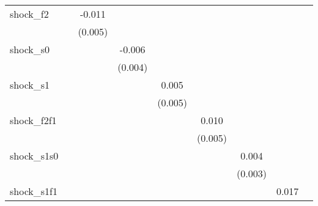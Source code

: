 {\begin{tabular}{l*{8}{c}}
\addlinespace
shock\_f2    &                     &      -0.011\sym{**} &                     &                     &                     &                     &                     &                     \\
            &                     &     (0.005)         &                     &                     &                     &                     &                     &                     \\
\addlinespace
shock\_s0    &                     &                     &      -0.006         &                     &                     &                     &                     &                     \\
            &                     &                     &     (0.004)         &                     &                     &                     &                     &                     \\
\addlinespace
shock\_s1    &                     &                     &                     &       0.005         &                     &                     &                     &                     \\
            &                     &                     &                     &     (0.005)         &                     &                     &                     &                     \\
\addlinespace
shock\_f2f1  &                     &                     &                     &                     &       0.010\sym{*}  &                     &                     &                     \\
            &                     &                     &                     &                     &     (0.005)         &                     &                     &                     \\
\addlinespace
shock\_s1s0  &                     &                     &                     &                     &                     &       0.004         &                     &                     \\
            &                     &                     &                     &                     &                     &     (0.003)         &                     &                     \\
\addlinespace
shock\_s1f1  &                     &                     &                     &                     &                     &                     &       0.017\sym{**} &                     \\

\end{tabular}}
